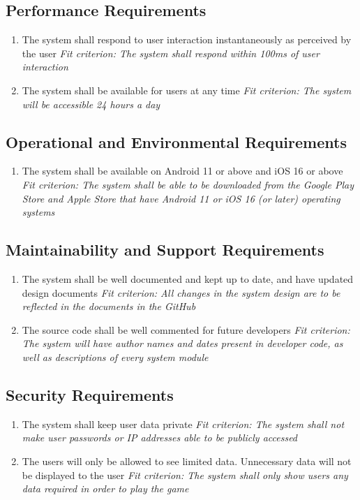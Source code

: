 \documentclass[12pt]{article}
\begin{document}
\subsection{Performance Requirements}
\begin{enumerate}[PR\arabic*.]
	\item The system shall respond to user interaction instantaneously as perceived by the user\newline
    \textit{Fit criterion: The system shall respond within 100ms of user interaction}
    \item The system shall be available for users at any time\newline
    \textit{Fit criterion: The system will be accessible 24 hours a day}
\end{enumerate}
\subsection{Operational and Environmental Requirements}
\begin{enumerate}[OE\arabic*.]
    \item The system shall be available on Android 11 or above and iOS 16 or above\newline
    \textit{Fit criterion: The system shall be able to be downloaded from the Google Play Store and Apple Store that have Android 11 or iOS 16 (or later) operating systems}
\end{enumerate}
\subsection{Maintainability and Support Requirements}
\begin{enumerate}[MS\arabic*.]
    \item The system shall be well documented and kept up to date, and have updated design documents\newline
    \textit{Fit criterion: All changes in the system design are to be reflected in the documents in the GitHub}
    \item The source code shall be well commented for future developers\newline
    \textit{Fit criterion: The system will have author names and dates present in developer code, as well as descriptions of every system module}
\end{enumerate}
\subsection{Security Requirements}
\begin{enumerate}[SR\arabic*.]
    \item The system shall keep user data private\newline
    \textit{Fit criterion: The system shall not make user passwords or IP addresses able to be publicly accessed}
    \item The users will only be allowed to see limited data. Unnecessary data will not be displayed to the user\newline
    \textit{Fit criterion: The system shall only show users any data required in order to play the game}
\end{enumerate}
\end{document}
